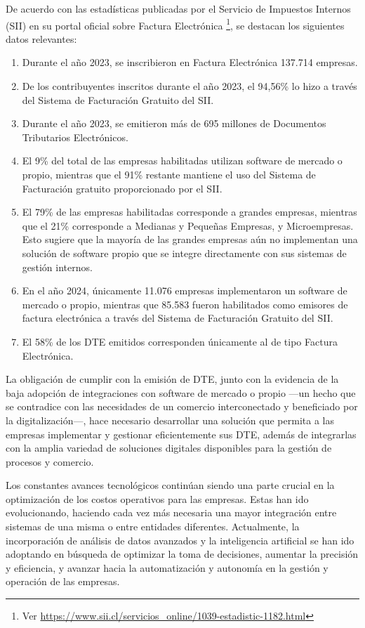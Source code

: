 De acuerdo con las estadísticas publicadas por el Servicio de Impuestos Internos (SII) en su portal oficial sobre Factura Electrónica \textcite{estadisticasFacturaElectronica} \footnote{Ver \url{https://www.sii.cl/servicios_online/1039-estadistic-1182.html}}, se destacan los siguientes datos relevantes:
\begin{enumerate}
	\item Durante el año 2023, se inscribieron en Factura Electrónica 137.714 empresas.
	\item De los contribuyentes inscritos durante el año 2023, el 94,56\% lo hizo a través del Sistema de Facturación Gratuito del SII.
	\item Durante el año 2023, se emitieron más de 695 millones de Documentos Tributarios Electrónicos.
	\item El 9\% del total de las empresas habilitadas utilizan software de mercado o propio, mientras que el 91\% restante mantiene el uso del Sistema de Facturación gratuito proporcionado por el SII.
	\item El 79\% de las empresas habilitadas corresponde a grandes empresas, mientras que el 21\% corresponde a Medianas y Pequeñas Empresas, y Microempresas. Esto sugiere que la mayoría de las grandes empresas aún no implementan una solución de software propio que se integre directamente con sus sistemas de gestión internos.
	\item En el año 2024, únicamente 11.076 empresas implementaron un software de mercado o propio, mientras que 85.583 fueron habilitados como emisores de factura electrónica a través del Sistema de Facturación Gratuito del SII.
	\item El 58\% de los DTE emitidos corresponden únicamente al de tipo Factura Electrónica.
\end{enumerate}

La obligación de cumplir con la emisión de DTE, junto con la evidencia de la baja adopción de integraciones con software de mercado o propio —un hecho que se contradice con las necesidades de un comercio interconectado y beneficiado por la digitalización—, hace necesario desarrollar una solución que permita a las empresas implementar y gestionar eficientemente sus DTE, además de integrarlas con la amplia variedad de soluciones digitales disponibles para la gestión de procesos y comercio.

Los constantes avances tecnológicos continúan siendo una parte crucial en la optimización de los costos operativos para las empresas. Estas han ido evolucionando, haciendo cada vez más necesaria una mayor integración entre sistemas de una misma o entre entidades diferentes. Actualmente, la incorporación de análisis de datos avanzados y la inteligencia artificial se han ido adoptando en búsqueda de optimizar la toma de decisiones, aumentar la precisión y eficiencia, y avanzar hacia la automatización y autonomía en la gestión y operación de las empresas.

